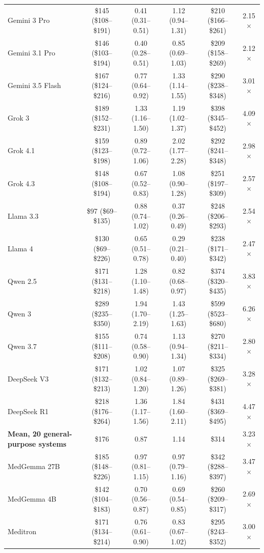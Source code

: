 \begin{table}[h!]
\begin{tabular}{l c c c c c}
Gemini 3 Pro & \$145 (\$108--\$191) & 0.41 (0.31--0.51) & 1.12 (0.94--1.31) & \$210 (\$166--\$261) & 2.15$\times$ \\
Gemini 3.1 Pro & \$146 (\$103--\$194) & 0.40 (0.28--0.51) & 0.85 (0.69--1.03) & \$209 (\$158--\$269) & 2.12$\times$ \\
Gemini 3.5 Flash & \$167 (\$124--\$216) & 0.77 (0.64--0.92) & 1.33 (1.14--1.55) & \$290 (\$238--\$348) & 3.01$\times$ \\
Grok 3 & \$189 (\$152--\$231) & 1.33 (1.16--1.50) & 1.19 (1.02--1.37) & \$398 (\$345--\$452) & 4.09$\times$ \\
Grok 4.1 & \$159 (\$123--\$198) & 0.89 (0.72--1.06) & 2.02 (1.77--2.28) & \$292 (\$241--\$348) & 2.98$\times$ \\
Grok 4.3 & \$148 (\$108--\$194) & 0.67 (0.52--0.83) & 1.08 (0.90--1.28) & \$251 (\$197--\$309) & 2.57$\times$ \\
Llama 3.3 & \$97 (\$69--\$135) & 0.88 (0.74--1.02) & 0.37 (0.26--0.49) & \$248 (\$206--\$293) & 2.54$\times$ \\
Llama 4 & \$130 (\$69--\$226) & 0.65 (0.51--0.78) & 0.29 (0.21--0.40) & \$238 (\$171--\$342) & 2.47$\times$ \\
Qwen 2.5 & \$171 (\$131--\$218) & 1.28 (1.10--1.48) & 0.82 (0.68--0.97) & \$374 (\$320--\$435) & 3.83$\times$ \\
Qwen 3 & \$289 (\$235--\$350) & 1.94 (1.70--2.19) & 1.43 (1.25--1.63) & \$599 (\$523--\$680) & 6.26$\times$ \\
Qwen 3.7 & \$155 (\$111--\$208) & 0.74 (0.58--0.90) & 1.13 (0.94--1.34) & \$270 (\$211--\$334) & 2.80$\times$ \\
DeepSeek V3 & \$171 (\$132--\$213) & 1.02 (0.84--1.20) & 1.07 (0.89--1.26) & \$325 (\$269--\$381) & 3.28$\times$ \\
DeepSeek R1 & \$218 (\$176--\$264) & 1.36 (1.17--1.56) & 1.84 (1.60--2.11) & \$431 (\$369--\$495) & 4.47$\times$ \\
\midrule
\textbf{Mean, 20 general-purpose systems} & \$176 & 0.87 & 1.14 & \$314 & 3.23$\times$ \\
\midrule
MedGemma 27B & \$185 (\$148--\$226) & 0.97 (0.81--1.15) & 0.97 (0.79--1.16) & \$342 (\$288--\$397) & 3.47$\times$ \\
MedGemma 4B & \$142 (\$104--\$183) & 0.70 (0.56--0.87) & 0.69 (0.54--0.85) & \$260 (\$209--\$317) & 2.69$\times$ \\
Meditron & \$171 (\$134--\$214) & 0.76 (0.61--0.90) & 0.83 (0.67--1.02) & \$295 (\$243--\$352) & 3.00$\times$ \\

\end{tabular}
\end{table}
